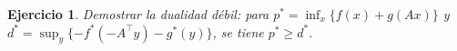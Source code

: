 \documentclass[11pt]{report}
\newtheorem{ex}{Ejercicio}
\newcommand{\R}{\mathbb{R}}
\newcommand{\dom}{\operatorname{dom}}
\newcommand{\ri}{\operatorname{ri}}
\newcommand{\subdiff}{\partial}
\begin{document}


\begin{ex}
Demostrar la dualidad débil: para
$p^*=\inf_x\{f(x)+g(Ax)\}$ y
$d^*=\sup_y\{-f^*(-A^{\!\top}y)-g^*(y)\}$, se tiene
$p^*\ge d^*$.
\end{ex}
\end{document}
